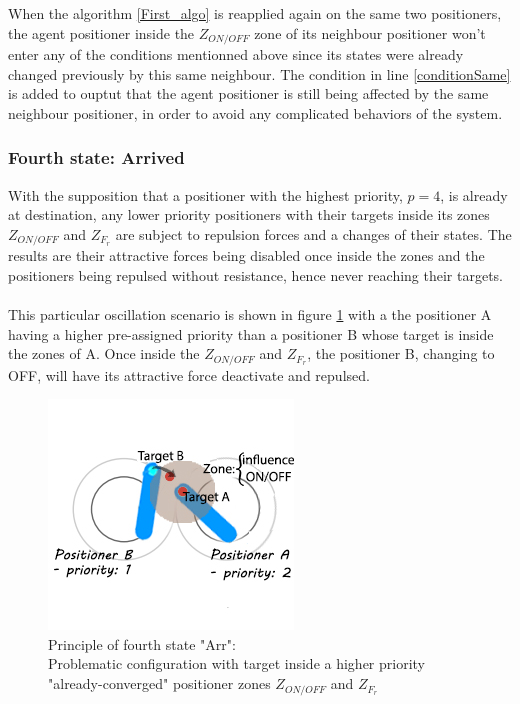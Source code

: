 \documentclass[]{spie}  %
\begin{document}
	When the algorithm \ref{First_algo} is reapplied again on the same two positioners, the agent positioner inside the $Z_{ON/OFF}$ zone of its neighbour positioner won't enter any of the conditions mentionned above since its states were already changed previously by this same neighbour. The condition in line \ref{conditionSame} is added to ouptut that the agent positioner is still being affected by the same neighbour positioner, in order to avoid any complicated behaviors of the system.  

	
	\subsubsection{Fourth state: Arrived}
	\label{sub_chap_fourth_state}
	With the supposition that a positioner with the highest priority, $p = 4$, is already at destination, any lower priority positioners with their targets inside its zones $Z_{ON/OFF}$ and $Z_{F_{r}}$  are subject to repulsion forces and a changes of their states. The results are their attractive forces being disabled once inside the zones and the positioners being repulsed without resistance, hence never reaching their targets.\\
	\\
	This particular oscillation scenario is shown in figure \ref{fourth_state} with a the positioner A having a higher pre-assigned priority than a positioner B whose target is inside the zones of A. Once inside the $Z_{ON/OFF}$ and $Z_{F_{r}}$, the positioner B, changing to OFF, will have its attractive force deactivate and repulsed.
	\begin{figure}[H]
		\centering
		\includegraphics[scale=0.64]{images/fourth_state.jpg}
		\caption{\centering	Principle of fourth state "Arr":\\
		Problematic configuration with target inside a higher priority "already-converged" positioner zones $Z_{ON/OFF}$ and $Z_{F_{r}}$ }
		\label{fourth_state}
	\end{figure}
\end{document}
